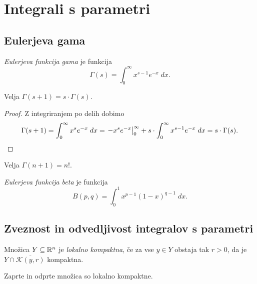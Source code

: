 \section{Integrali s parametri}

\subsection{Eulerjeva gama}


\begin{definicija}
\emph{Eulerjeva funkcija gama} je funkcija
\[
\Gamma(s) = \int_0^\infty x^{s-1} e^{-x}\;dx.
\]
\end{definicija}

\begin{trditev}
Velja $\Gamma(s+1) = s \cdot \Gamma(s)$.
\end{trditev}

\begin{proof}
Z integriranjem po delih dobimo
\[
\Gamma(s+1) =
\int_0^\infty x^s e^{-x}\;dx =
\left. -x^s e^{-x}\right|_{0}^{\infty} +
s \cdot \int_0^\infty x^{s-1} e^{-x}\;dx =
s \cdot \Gamma(s). \qedhere
\]
\end{proof}

\begin{posledica}
Velja $\Gamma(n+1) = n!$.
\end{posledica}

\begin{definicija}
\emph{Eulerjeva funkcija beta} je funkcija
\[
B(p,q) = \int_0^1 x^{p-1}(1-x)^{q-1}\;dx.
\]
\end{definicija}

\newpage

\subsection{Zveznost in odvedljivost integralov s parametri}

\begin{definicija}
Množica $Y \subseteq \mathbb{R}^n$ je
\emph{lokalno kompaktna}, če za
vse $y \in Y$ obstaja tak $r>0$, da je
$Y \cap \overline{\mathcal{K}(y,r)}$ kompaktna.
\end{definicija}

\begin{opomba}
Zaprte in odprte množica so lokalno kompaktne.
\end{opomba}

